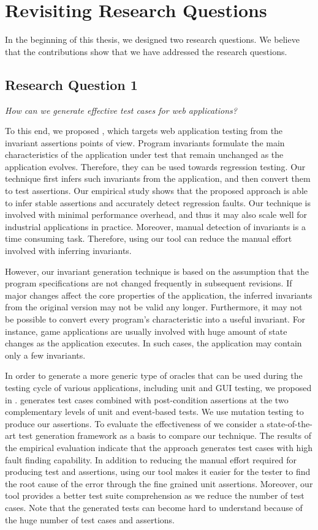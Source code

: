\section{Revisiting Research Questions} 
In the beginning of this thesis, we designed two research questions. We believe that the contributions show that we have addressed the research questions.
\subsection{Research Question 1}

\emph{How can we generate effective test cases for \javascript web applications?}

 To this end, we proposed \jsart, which targets web application testing from the invariant assertions points of view. Program invariants formulate the main characteristics of the application under test that remain unchanged as the application evolves. Therefore, they can be used towards regression testing. Our technique first infers such invariants from the application, and then convert them to test assertions. Our empirical study shows that the proposed approach is able to infer stable assertions and accurately detect regression faults. Our technique is involved with minimal performance overhead, and thus it may also scale well for industrial applications in practice.  Moreover, manual detection of invariants is a time consuming task. Therefore, using our tool can reduce the manual effort involved with inferring invariants. 

However, our invariant generation technique is based on the assumption that the program specifications are not changed frequently in subsequent revisions. If major changes affect the core properties of the application, the inferred invariants from the original version may not be valid any longer. Furthermore, it may not be possible to convert every program's characteristic into a useful invariant. For instance, game applications are usually involved with huge amount of state changes as the application executes. In such cases, the application may contain only a few invariants. 

 In order to generate a more generic type of oracles that can be used during the testing cycle of various applications, including unit and GUI testing, we proposed \jseft in . \jseft generates test cases combined with post-condition assertions at the two complementary levels of unit and event-based tests. We use mutation testing to produce our assertions. 
To evaluate the effectiveness of \jseft we consider a state-of-the-art \javascript test generation framework as a basis to compare our technique. The results of the empirical evaluation indicate that the approach generates test cases with high fault finding capability. In addition to reducing the manual effort required for producing test and assertions, using our tool makes it easier for the tester to find the root cause of the error through the fine grained unit assertions. Moreover, our tool provides a better test suite comprehension as we reduce the number of test cases. Note that the generated tests can become hard to understand because of the huge number of test cases and assertions.

